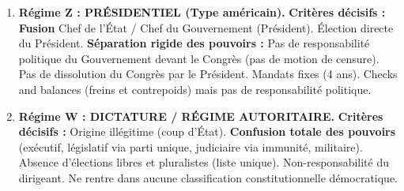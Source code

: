 \documentclass[11pt]{article}
\begin{document}
\begin{exoresolu}
\begin{enumerate}
    \textbf{Critères décisifs :} Séparation stricte Chef de l'État (Roi, symbolique, non élu) / Chef du Gouvernement (PM, politique, issu du Parlement). Responsabilité du Gouvernement \textbf{uniquement} devant le Parlement. Dissolution possible mais contrôlée (contreseing). Le pouvoir effectif est entre les mains de la majorité parlementaire.
    \item \textbf{Régime Z : PRÉSIDENTIEL (Type américain).}
    \textbf{Critères décisifs :} \textbf{Fusion} Chef de l'État / Chef du Gouvernement (Président). Élection directe du Président. \textbf{Séparation rigide des pouvoirs :} Pas de responsabilité politique du Gouvernement devant le Congrès (pas de motion de censure). Pas de dissolution du Congrès par le Président. Mandats fixes (4 ans). Checks and balances (freins et contrepoids) mais pas de responsabilité politique.
    \item \textbf{Régime W : DICTATURE / RÉGIME AUTORITAIRE.}
    \textbf{Critères décisifs :} Origine illégitime (coup d'État). \textbf{Confusion totale des pouvoirs} (exécutif, législatif via parti unique, judiciaire via immunité, militaire). Absence d'élections libres et pluralistes (liste unique). Non-responsabilité du dirigeant. Ne rentre dans aucune classification constitutionnelle démocratique.
\end{enumerate}
\end{exoresolu}
\end{document}
